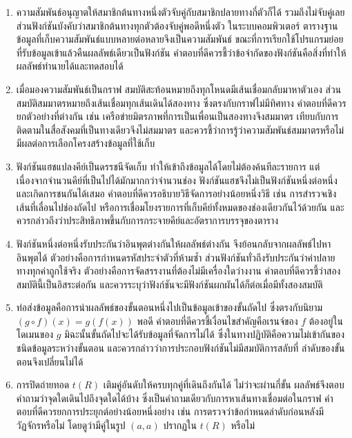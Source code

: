 \begin{enumerate}
    \item ความสัมพันธ์อนุญาตให้สมาชิกต้นทางหนึ่งตัวจับคู่กับสมาชิกปลายทางกี่ตัวก็ได้ รวมถึงไม่จับคู่เลย ส่วนฟังก์ชันบังคับว่าสมาชิกต้นทางทุกตัวต้องจับคู่พอดีหนึ่งตัว ในระบบคอมพิวเตอร์ ตารางฐานข้อมูลที่เก็บความสัมพันธ์แบบหลายต่อหลายจึงเป็นความสัมพันธ์ ขณะที่การเรียกใช้โปรแกรมย่อยที่รับข้อมูลเข้าแล้วคืนผลลัพธ์เดียวเป็นฟังก์ชัน คำตอบที่ดีควรชี้ว่าข้อจำกัดของฟังก์ชันคือสิ่งที่ทำให้ผลลัพธ์ทำนายได้และทดสอบได้

    \item เมื่อมองความสัมพันธ์เป็นกราฟ สมบัติสะท้อนหมายถึงทุกโหนดมีเส้นเชื่อมกลับมาหาตัวเอง ส่วนสมบัติสมมาตรหมายถึงเส้นเชื่อมทุกเส้นเดินได้สองทาง ซึ่งตรงกับกราฟไม่มีทิศทาง คำตอบที่ดีควรยกตัวอย่างที่ต่างกัน เช่น เครือข่ายมิตรภาพที่การเป็นเพื่อนเป็นสองทางจึงสมมาตร เทียบกับการติดตามในสื่อสังคมที่เป็นทางเดียวจึงไม่สมมาตร และควรชี้ว่าการรู้ว่าความสัมพันธ์สมมาตรหรือไม่ มีผลต่อการเลือกโครงสร้างข้อมูลที่ใช้เก็บ

    \item ฟังก์ชันแฮชแปลงคีย์เป็นดรรชนีจัดเก็บ ทำให้เข้าถึงข้อมูลได้โดยไม่ต้องค้นทีละรายการ แต่เนื่องจากจำนวนคีย์ที่เป็นไปได้มักมากกว่าจำนวนช่อง ฟังก์ชันแฮชจึงไม่เป็นฟังก์ชันหนึ่งต่อหนึ่ง และเกิดการชนกันได้เสมอ คำตอบที่ดีควรอธิบายวิธีจัดการอย่างน้อยหนึ่งวิธี เช่น การสำรวจเชิงเส้นที่เลื่อนไปช่องถัดไป หรือการเชื่อมโยงรายการที่เก็บคีย์ทั้งหมดของช่องเดียวกันไว้ด้วยกัน และควรกล่าวถึงว่าประสิทธิภาพขึ้นกับการกระจายคีย์และอัตราการบรรจุของตาราง

    \item ฟังก์ชันหนึ่งต่อหนึ่งรับประกันว่าอินพุตต่างกันให้ผลลัพธ์ต่างกัน จึงย้อนกลับจากผลลัพธ์ไปหาอินพุตได้ ตัวอย่างคือการกำหนดรหัสประจำตัวที่ห้ามซ้ำ ส่วนฟังก์ชันทั่วถึงรับประกันว่าค่าปลายทางทุกค่าถูกใช้จริง ตัวอย่างคือการจัดสรรงานที่ต้องไม่มีเครื่องใดว่างงาน คำตอบที่ดีควรชี้ว่าสองสมบัตินี้เป็นอิสระต่อกัน และควรระบุว่าฟังก์ชันจะมีฟังก์ชันผกผันได้ก็ต่อเมื่อมีทั้งสองสมบัติ

    \item ท่อส่งข้อมูลคือการนำผลลัพธ์ของขั้นตอนหนึ่งไปเป็นข้อมูลเข้าของขั้นถัดไป ซึ่งตรงกับนิยาม $(g \circ f)(x) = g(f(x))$ พอดี คำตอบที่ดีควรชี้เงื่อนไขสำคัญคือเรนจ์ของ $f$ ต้องอยู่ในโดเมนของ $g$ มิฉะนั้นขั้นถัดไปจะได้รับข้อมูลที่จัดการไม่ได้ ซึ่งในทางปฏิบัติคือความไม่เข้ากันของชนิดข้อมูลระหว่างขั้นตอน และควรกล่าวว่าการประกอบฟังก์ชันไม่มีสมบัติการสลับที่ ลำดับของขั้นตอนจึงเปลี่ยนไม่ได้

    \item การปิดถ่ายทอด $t(R)$ เติมคู่อันดับให้ครบทุกคู่ที่เดินถึงกันได้ ไม่ว่าจะผ่านกี่ขั้น ผลลัพธ์จึงตอบคำถามว่าจุดใดเดินไปถึงจุดใดได้บ้าง ซึ่งเป็นคำถามเดียวกับการหาเส้นทางเชื่อมต่อในกราฟ คำตอบที่ดีควรยกการประยุกต์อย่างน้อยหนึ่งอย่าง เช่น การตรวจว่าข้อกำหนดลำดับก่อนหลังมีวัฏจักรหรือไม่ โดยดูว่ามีคู่ในรูป $(a,a)$ ปรากฏใน $t(R)$ หรือไม่


\end{enumerate}
